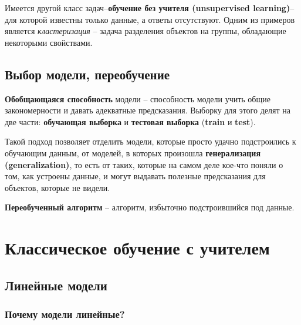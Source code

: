 \documentclass[a4paper, 10pt, openany]{book} %
\begin{document}
	Имеется другой класс задач--\textbf{обучение без учителя (unsupervised learning)}-- для которой известны только данные, а ответы отсутствуют. Одним из примеров является \textit{кластеризация} -- задача разделения объектов на группы, обладающие некоторыми свойствами.
	
	\section{Выбор модели, переобучение}
	
	\textbf{Обобщающаяся способность} модели -- способность модели учить общие закономерности и давать адекватные предсказания. Выборку для этого делят на две части: \textbf{обучающая выборка} и \textbf{тестовая выборка} (\textbf{train} и \textbf{test}). 
	
	Такой подход позволяет отделить модели, которые просто удачно подстроились к обучающим данным, от моделей, в которых произошла \textbf{генерализация (generalization)}, то есть от таких, которые на самом деле кое-что поняли о том, как устроены данные, и могут выдавать полезные предсказания для объектов, которые не видели.
	
	\textbf{Переобученный алгоритм} -- алгоритм, избыточно подстроившийся под данные.
	
	\chapter{Классическое обучение с учителем}
	
	\section{Линейные модели}
		
	\subsection{Почему модели линейные?}
	
\end{document}
